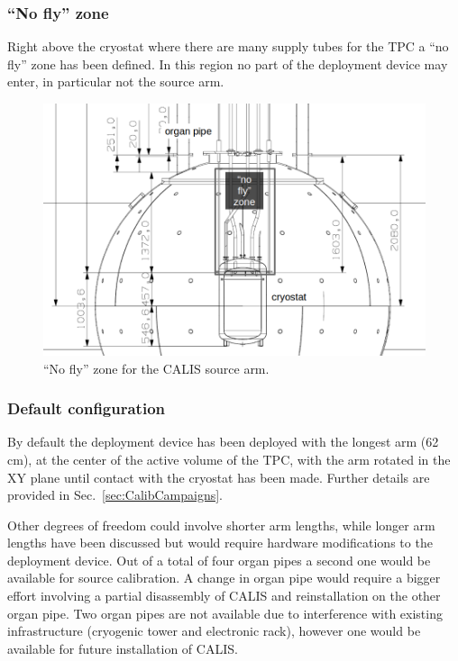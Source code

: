 \subsubsection{``No fly'' zone}
Right above the cryostat where there are many supply tubes for the TPC a ``no fly'' zone has been defined. In this region no part of the deployment device may enter, in particular not the source arm.

\begin{figure}[htbp]
 \centering
  \includegraphics[scale=0.5]{Figures/NoFlyZone.png}
  \caption{``No fly'' zone for the CALIS source arm.}
  \label{fig:NoFlyZone}
\end{figure} 

\subsubsection{Default configuration}
By default the deployment device has been deployed with the longest arm (62 cm), at the center of the active volume of the TPC, with the arm rotated in the XY plane until contact with the cryostat has been made. Further details are provided in Sec.~\ref{sec:CalibCampaigns}.

Other degrees of freedom could involve shorter arm lengths, while longer arm lengths have been discussed but would require hardware modifications to the deployment device. Out of a total of four organ pipes a second one would be available for source calibration. A change in organ pipe would require a bigger effort involving a partial disassembly of CALIS and reinstallation on the other organ pipe. Two organ pipes are not available due to interference with existing infrastructure (cryogenic tower and electronic rack), however one would be available for future installation of CALIS.


